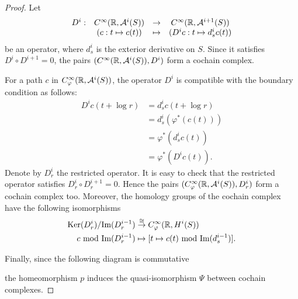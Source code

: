 \begin{proof}
Let
\begin{equation*}
\begin{matrix}
    {D}^{i}:&{C}^{\infty}({\mathbb{R}},\mathcal{A}^{i}(S)) &\rightarrow &{C}^{\infty}({\mathbb{R}},\mathcal{A}^{i+1}(S)) \\
     &(c:t \mapsto c(t)) &\mapsto & ({D}^{i}c : t \mapsto d^{i}_{s}c(t))
\end{matrix}
\end{equation*}
be an operator, where $d^{i}_{s}$ is the exterior derivative on $S$. 
Since it satisfies ${D}^{i} \circ {D}^{i+1}=0$, the pairs $({C}^{\infty}({\mathbb{R}},\mathcal{A}^{i}(S)), {D}^{i})$ form a cochain complex.

For a path $c$ in ${C}^{\infty}_{\varphi}({\mathbb{R}},\mathcal{A}^{i}(S))$, the operator ${D}^{i}$ is compatible with the boundary condition as follows:
\begin{equation*}
\begin{split}
    {D}^{i}c(t+\log{r}) &= d^{i}_{s}c(t+\log{r})\\
    &=d^{i}_{s}(\varphi^{*}(c(t))) \\
    &=\varphi^{*}(d^{i}_{s}c(t)) \\
    &=\varphi^{*}({D}^{i}c(t)).
\end{split}
\end{equation*}
Denote by ${D}^{i}_{r}$ the restricted operator.
It is easy to check that the restricted operator satisfies ${D}^{i}_{r} \circ {D}^{i+1}_{r}=0$. 
Hence the pairs $({C}^{\infty}_{\varphi}({\mathbb{R}},\mathcal{A}^{i}(S)),{D}^{i}_{r})$ form a cochain complex too.
Moreover, the homology groups of the cochain complex have the following isomorphisms
\begin{equation*}
    \begin{split}
        \mbox{Ker}(D^{i}_{r})/\mbox{Im}(D^{i-1}_{r})&\overset{\cong}{\rightarrow}{C}^{\infty}_{\varphi}({\mathbb{R}},{H}^{i}(S))\\
        {c \mbox{ mod }\mbox{Im}(D^{i-1}_{r})}&\mapsto[{t\mapsto{c(t)\mbox{ mod }\mbox{Im}(d^{i-1}_{s})}}].
    \end{split}
\end{equation*}

Finally, since the following diagram is commutative
\begin{center}
\end{center}
the homeomorphism $p$ induces the quasi-isomorphism $\Psi$ between cochain complexes.
\end{proof}


